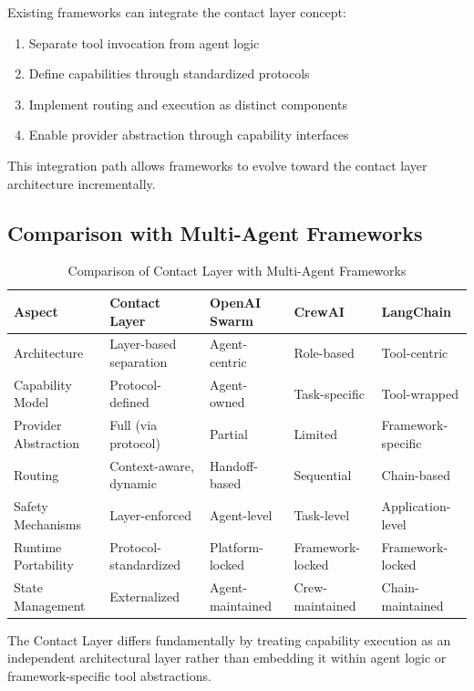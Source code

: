 Existing frameworks can integrate the contact layer concept:
\begin{enumerate}[label=\arabic*.]
\item Separate tool invocation from agent logic
\item Define capabilities through standardized protocols
\item Implement routing and execution as distinct components
\item Enable provider abstraction through capability interfaces
\end{enumerate}

This integration path allows frameworks to evolve toward the contact layer architecture incrementally.

\subsection{Comparison with Multi-Agent Frameworks}

\begin{table}[h]
\centering
\caption{Comparison of Contact Layer with Multi-Agent Frameworks}
\begin{tabular}{lllll}
\toprule
\textbf{Aspect} & \textbf{Contact Layer} & \textbf{OpenAI Swarm} & \textbf{CrewAI} & \textbf{LangChain} \\
\midrule
Architecture & Layer-based separation & Agent-centric & Role-based & Tool-centric \\
Capability Model & Protocol-defined & Agent-owned & Task-specific & Tool-wrapped \\
Provider Abstraction & Full (via protocol) & Partial & Limited & Framework-specific \\
Routing & Context-aware, dynamic & Handoff-based & Sequential & Chain-based \\
Safety Mechanisms & Layer-enforced & Agent-level & Task-level & Application-level \\
Runtime Portability & Protocol-standardized & Platform-locked & Framework-locked & Framework-locked \\
State Management & Externalized & Agent-maintained & Crew-maintained & Chain-maintained \\
\bottomrule
\end{tabular}
\end{table}

The Contact Layer differs fundamentally by treating capability execution as an independent architectural layer rather than embedding it within agent logic or framework-specific tool abstractions.
